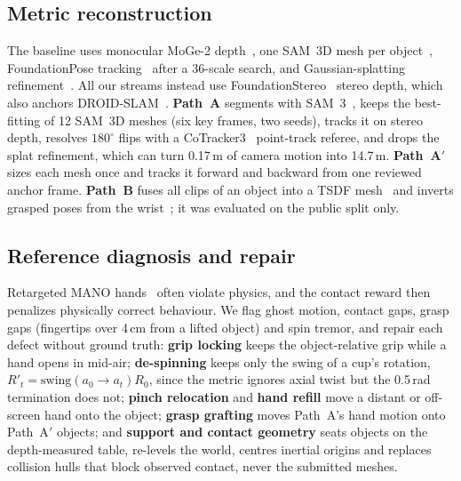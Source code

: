 \documentclass[10pt]{nvidiaextabstract}
\begin{document}
\subsection{Metric reconstruction}
\label{sec:recon}
The baseline uses monocular MoGe-2 depth~\cite{wang2025moge2}, one SAM~3D mesh per object~\cite{sam3dteam2025sam3d}, FoundationPose tracking~\cite{wen2024foundationpose} after a 36-scale search, and Gaussian-splatting refinement~\cite{kerbl20233dgs,ye2025gsplat}. All our streams instead use FoundationStereo~\cite{wen2025foundationstereo} stereo depth, which also anchors DROID-SLAM~\cite{teed2021droid}.
\textbf{Path~A} segments with SAM~3~\cite{carion2025sam3}, keeps the best-fitting of 12 SAM~3D meshes (six key frames, two seeds), tracks it on stereo depth, resolves $180^\circ$ flips with a CoTracker3~\cite{karaev2025cotracker3} point-track referee, and drops the splat refinement, which can turn 0.17\,m of camera motion into 14.7\,m.
\textbf{Path~A$'$} sizes each mesh once and tracks it forward and backward from one reviewed anchor frame.
\textbf{Path~B} fuses all clips of an object into a TSDF mesh~\cite{curless1996volumetric} and inverts grasped poses from the wrist~\cite{rohit}; it was evaluated on the public split only.

\subsection{Reference diagnosis and repair}
\label{sec:repair}
Retargeted MANO hands~\cite{romero2017mano} often violate physics, and the contact reward then penalizes physically correct behaviour. We flag ghost motion, contact gaps, grasp gaps (fingertips over 4\,cm from a lifted object) and spin tremor, and repair each defect without ground truth: \textbf{grip locking} keeps the object-relative grip while a hand opens in mid-air; \textbf{de-spinning} keeps only the swing of a cup's rotation, $R'_t=\mathrm{swing}(a_0\!\to\!a_t)R_0$, since the metric ignores axial twist but the 0.5\,rad termination does not; \textbf{pinch relocation} and \textbf{hand refill} move a distant or off-screen hand onto the object; \textbf{grasp grafting} moves Path~A's hand motion onto Path~A$'$ objects; and \textbf{support and contact geometry} seats objects on the depth-measured table, re-levels the world, centres inertial origins and replaces collision hulls that block observed contact, never the submitted meshes.
\end{document}
